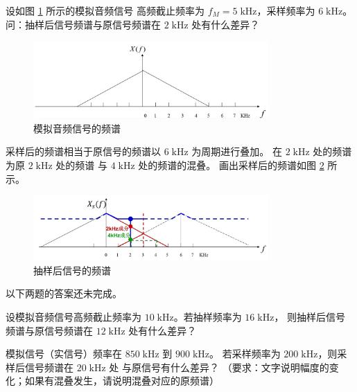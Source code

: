 \begin{example}
    设如图 \ref{fig:aliasing-example-3} 所示的模拟音频信号
    高频截止频率为 $f_M = 5\;\mathrm{kHz}$，采样频率为 $6\;\mathrm{kHz}$。
    问：抽样后信号频谱与原信号频谱在 $2\;\mathrm{kHz}$ 处有什么差异？
    \begin{figure}[H]
        \centering
        \includegraphics[width=0.8\textwidth]{chap2/img/aliasing-example-3.png}
        \caption{模拟音频信号的频谱}
        \label{fig:aliasing-example-3}
    \end{figure}
\end{example}

\begin{solution}
    采样后的频谱相当于原信号的频谱以 $6\;\mathrm{kHz}$ 为周期进行叠加。
    在 $2\;\mathrm{kHz}$ 处的频谱为原 $2\;\mathrm{kHz}$ 处的频谱
    与 $4\;\mathrm{kHz}$ 处的频谱的混叠。
    画出采样后的频谱如图 \ref{fig:aliasing-example-4} 所示。
    \begin{figure}[H]
        \centering
        \includegraphics[width=0.8\textwidth]{chap2/img/aliasing-example-4.png}
        \caption{抽样后信号的频谱}
        \label{fig:aliasing-example-4}
    \end{figure}
\end{solution}

\begin{note}
    以下两题的答案还未完成。
\end{note}

\begin{example}
    设模拟音频信号高频截止频率为 $10\;\mathrm{kHz}$。若抽样频率为 $16\;\mathrm{kHz}$，
    则抽样后信号频谱与原信号频谱在 $12\;\mathrm{kHz}$ 处有什么差异？
\end{example}

\begin{example}
    模拟信号（实信号）频率在 $850\;\mathrm{kHz}$ 到 $900\;\mathrm{kHz}$。
    若采样频率为 $200\;\mathrm{kHz}$，则采样后信号频谱在 $20\;\mathrm{kHz}$ 处
    与原信号有什么差异？
    （要求：文字说明幅度的变化；如果有混叠发生，请说明混叠对应的原频谱）
\end{example}

